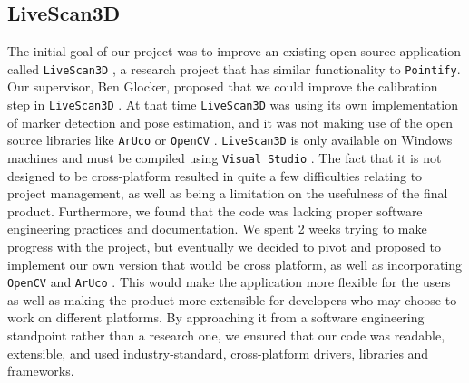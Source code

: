 \documentclass{article}
\begin{document}
\subsection{LiveScan3D}
The initial goal of our project was to improve an existing open source application called \texttt{LiveScan3D} \cite{livescan}, a research project that has similar functionality to \texttt{Pointify}. Our supervisor, Ben Glocker, proposed that we could improve the calibration step in \texttt{LiveScan3D} \cite{livescan}. At that time \texttt{LiveScan3D} \cite{livescan} was using its own implementation of marker detection and pose estimation, and it was not making use of the open source libraries like \texttt{ArUco} \cite{aruco} or \texttt{OpenCV} \cite{opencv}. \texttt{LiveScan3D} \cite{livescan} is only available on Windows machines and must be compiled using \texttt{Visual Studio} \cite{vs}. The fact that it is not designed to be cross-platform resulted in quite a few difficulties relating to project management, as well as being a limitation on the usefulness of the final product. Furthermore, we found that the code was lacking proper software engineering practices and documentation. We spent 2 weeks trying to make progress with the project, but eventually we decided to pivot and proposed to implement our own version that would be cross platform, as well as incorporating \texttt{OpenCV} \cite{opencv} and \texttt{ArUco} \cite{aruco}. This would make the application more flexible for the users as well as making the product more extensible for developers who may choose to work on different platforms. By approaching it from a software engineering standpoint rather than a research one, we ensured that our code was readable, extensible, and used industry-standard, cross-platform drivers, libraries and frameworks.
\end{document}
